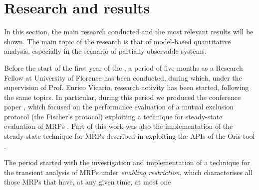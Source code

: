 
\section*{Research and results}
  
  In this section, the main research conducted and the most relevant results will be shown. The main topic of the  research is that of model-based quantitative analysis, especially in the scenario of partially observable systems.
  
  Before the start of the first year of the , a period of five months as a Research Fellow at University of Florence has been conducted, during which, under the supervision of Prof. Enrico Vicario, research activity has been started, following the same topics. In particular, during this period we produced the conference paper \cite{martina2016performance}, which focused on the performance evaluation of a mutual exclusion protocol (the Fischer's protocol) exploiting a technique for steady-state evaluation of \acp{MRP} \cite{logothetis1995markov}. Part of this work was also the implementation of the steady-state technique for \acp{MRP} described in \cite{logothetis1995markov} exploiting the \acp{API} of the Oris tool \cite{bucci2010oris}.
  
  The  period started with the investigation and implementation of a technique for the transient analysis of \acp{MRP} under \textit{enabling restriction}, which characterises all those \acp{MRP} that have, at any given time, at most one 
  
\newpage
